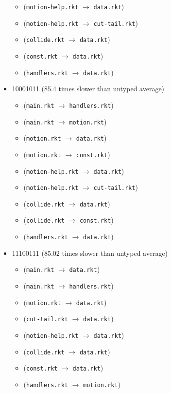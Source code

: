\documentclass{article}
\newcommand{\mono}[1]{\texttt{#1}}
\begin{document}
\begin{itemize}
\begin{itemize}
  \item (\mono{motion-help.rkt} $\rightarrow$ \mono{data.rkt})
  \item (\mono{motion-help.rkt} $\rightarrow$ \mono{cut-tail.rkt})
  \item (\mono{collide.rkt} $\rightarrow$ \mono{data.rkt})
  \item (\mono{const.rkt} $\rightarrow$ \mono{data.rkt})
  \item (\mono{handlers.rkt} $\rightarrow$ \mono{data.rkt})
  \end{itemize}
\item 10001011 (85.4 times slower than untyped average)
  \begin{itemize}
  \item (\mono{main.rkt} $\rightarrow$ \mono{handlers.rkt})
  \item (\mono{main.rkt} $\rightarrow$ \mono{motion.rkt})
  \item (\mono{motion.rkt} $\rightarrow$ \mono{data.rkt})
  \item (\mono{motion.rkt} $\rightarrow$ \mono{const.rkt})
  \item (\mono{motion-help.rkt} $\rightarrow$ \mono{data.rkt})
  \item (\mono{motion-help.rkt} $\rightarrow$ \mono{cut-tail.rkt})
  \item (\mono{collide.rkt} $\rightarrow$ \mono{data.rkt})
  \item (\mono{collide.rkt} $\rightarrow$ \mono{const.rkt})
  \item (\mono{handlers.rkt} $\rightarrow$ \mono{data.rkt})
  \end{itemize}
\item 11100111 (85.02 times slower than untyped average)
  \begin{itemize}
  \item (\mono{main.rkt} $\rightarrow$ \mono{data.rkt})
  \item (\mono{main.rkt} $\rightarrow$ \mono{handlers.rkt})
  \item (\mono{motion.rkt} $\rightarrow$ \mono{data.rkt})
  \item (\mono{cut-tail.rkt} $\rightarrow$ \mono{data.rkt})
  \item (\mono{motion-help.rkt} $\rightarrow$ \mono{data.rkt})
  \item (\mono{collide.rkt} $\rightarrow$ \mono{data.rkt})
  \item (\mono{const.rkt} $\rightarrow$ \mono{data.rkt})
  \item (\mono{handlers.rkt} $\rightarrow$ \mono{motion.rkt})

\end{itemize}
\end{itemize}
\end{document}
